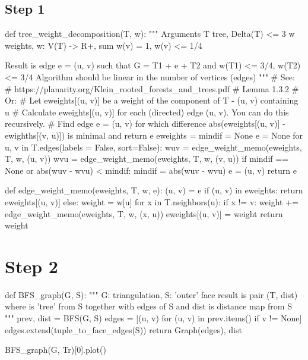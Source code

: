 \subsection*{Step 1}

\begin{sageCell}
def tree_weight_decomposition(T, w):
    """
    Arguments
    T tree, Delta(T) <= 3
    w weights, w: V(T) -> R+, sum w(v) = 1, w(v) <= 1/4

    Result is edge e = (u, v) such that G = T1 + e + T2 and
    w(T1) <= 3/4, w(T2) <= 3/4
    Algorithm should be linear in the number of vertices (edges)
    """
    # See:
    # https://planarity.org/Klein_rooted_forests_and_trees.pdf
    # Lemma 1.3.2
    # Or:
    # Let eweights[(u, v)] be a weight of the component of T - (u, v) containing u
    # Calculate eweights[(u, v)] for each (directed) edge (u, v). You can do this recursively.
    # Find edge e = (u, v) for which difference abs(eweights[(u, v)] - ewighths[(v, u)]) is minimal and return e
    eweights = {}
    mindif = None
    e = None
    for u, v in T.edges(labels = False, sort=False):
        wuv = edge_weight_memo(eweights, T, w, (u, v))
        wvu = edge_weight_memo(eweights, T, w, (v, u))
        if mindif == None or abs(wuv - wvu) < mindif:
            mindif = abs(wuv - wvu)
            e = (u, v)
    return e

def edge_weight_memo(eweights, T, w, e):
    (u, v) = e
    if (u, v) in eweights:
        return eweights[(u, v)]
    else:
        weight = w[u]
        for x in T.neighbors(u):
            if x != v:
                weight += edge_weight_memo(eweights, T, w, (x, u))
        eweights[(u, v)] = weight
        return weight
\end{sageCell}

\section*{Step 2}

\begin{sageCell}
def BFS_graph(G, S):
    """
    G: triangulation,
    S: 'outer' face
    result is pair (T, dist) where is 'tree' from S together with edges of S
    and dist is distance map from S
    """
    prev, dist = BFS(G, S)
    edges = [(u, v) for (u, v) in prev.items() if v != None]
    edges.extend(tuple_to_face_edges(S))
    return Graph(edges), dist
\end{sageCell}

\begin{sageCell}
    BFS_graph(G, Tr)[0].plot()
\end{sageCell}

